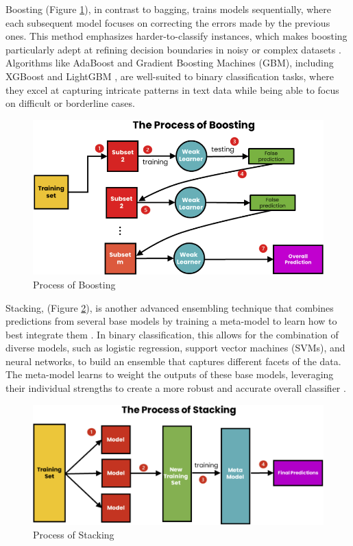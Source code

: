 \documentclass{Configuration_Files/PoliMi3i_thesis}
\begin{document}
Boosting (Figure \ref{ensemble_boosting}), in contrast to bagging, trains models sequentially, where each subsequent model focuses on correcting the errors made by the previous ones. This method emphasizes harder-to-classify instances, which makes boosting particularly adept at refining decision boundaries in noisy or complex datasets \cite{freund1997decision}. Algorithms like AdaBoost and Gradient Boosting Machines (GBM), including XGBoost \cite{chen2016xgboost} and LightGBM \cite{ke2017lightgbm}, are well-suited to binary classification tasks, where they excel at capturing intricate patterns in text data while being able to focus on difficult or borderline cases.

\begin{figure}[h!] 
\centering 
\includegraphics[width=0.73\linewidth, height=0.25\textheight]{Images/boosting.png} 
\caption{Process of Boosting \cite{odegua2019empirical}} 
\label{ensemble_boosting} 
\end{figure} 
\FloatBarrier

Stacking, (Figure \ref{ensemble_stacking}), is another advanced ensembling technique that combines predictions from several base models by training a meta-model to learn how to best integrate them \cite{wolpert1992stacked}. In binary classification, this allows for the combination of diverse models, such as logistic regression, support vector machines (SVMs), and neural networks, to build an ensemble that captures different facets of the data. The meta-model learns to weight the outputs of these base models, leveraging their individual strengths to create a more robust and accurate overall classifier \cite{zhou2012ensemble}.

\begin{figure}[h!] 
\centering 
\includegraphics[width=0.75\linewidth, height=0.25\textheight]{Images/stacking.png} 
\caption{Process of Stacking \cite{odegua2019empirical}} 
\label{ensemble_stacking} 
\end{figure} 
\FloatBarrier
\end{document}
